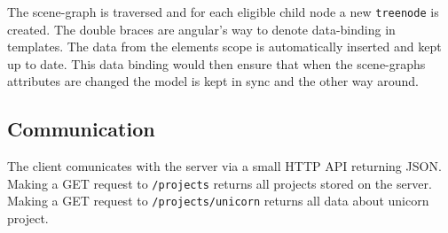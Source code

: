 The scene-graph is traversed and for each eligible child node a new
\texttt{treenode} is created. The double braces are angular's way
to denote data-binding in templates. The data from the elements scope is
automatically inserted and kept up to date. This data binding would then
ensure that when the scene-graphs attributes are changed the model is
kept in sync and the other way around.

\subsection{Communication}
\label{interaction}

The client comunicates with the server via a small HTTP API returning \gls{JSON}.
Making a GET request to \texttt{/projects} returns all projects stored on the server.
Making a GET request to \texttt{/projects/unicorn} returns all data about unicorn project.
